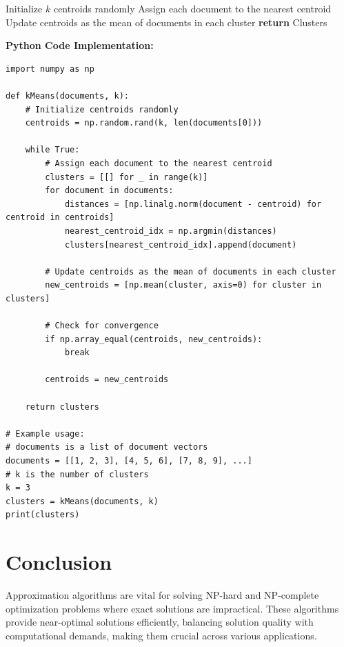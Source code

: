 \documentclass[12pt]{book} %
\begin{document}
\begin{algorithm}
\caption{k-means Algorithm}
\begin{algorithmic}[1]
\State Initialize \(k\) centroids randomly
\Repeat
    \State Assign each document to the nearest centroid
    \State Update centroids as the mean of documents in each cluster
\State \textbf{return} Clusters
\EndProcedure
\end{algorithmic}
\end{algorithm}

\FloatBarrier
\textbf{Python Code Implementation:}
\FloatBarrier
\begin{lstlisting}
import numpy as np

def kMeans(documents, k):
    # Initialize centroids randomly
    centroids = np.random.rand(k, len(documents[0]))

    while True:
        # Assign each document to the nearest centroid
        clusters = [[] for _ in range(k)]
        for document in documents:
            distances = [np.linalg.norm(document - centroid) for centroid in centroids]
            nearest_centroid_idx = np.argmin(distances)
            clusters[nearest_centroid_idx].append(document)

        # Update centroids as the mean of documents in each cluster
        new_centroids = [np.mean(cluster, axis=0) for cluster in clusters]

        # Check for convergence
        if np.array_equal(centroids, new_centroids):
            break

        centroids = new_centroids

    return clusters

# Example usage:
# documents is a list of document vectors
documents = [[1, 2, 3], [4, 5, 6], [7, 8, 9], ...]
# k is the number of clusters
k = 3
clusters = kMeans(documents, k)
print(clusters)
\end{lstlisting}

\section{Conclusion}

Approximation algorithms are vital for solving NP-hard and NP-complete optimization problems where exact solutions are impractical. These algorithms provide near-optimal solutions efficiently, balancing solution quality with computational demands, making them crucial across various applications.
\end{document}
